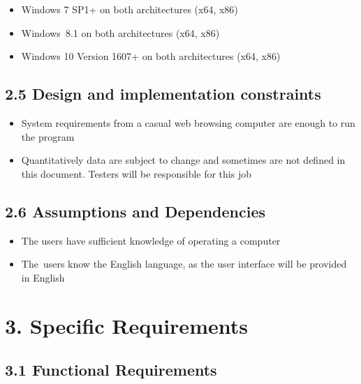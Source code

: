 \documentclass[12pt]{report}
\renewcommand{\_}{\kern-1.5pt\textunderscore\kern-1.5pt}
\begin{document}
\begin{itemize}
	\item Windows 7 SP1+ on both architectures (x64, x86)\par

	\item Windows\  8.1 on both architectures (x64, x86)\par

	\item Windows 10 Version 1607+ on both architectures (x64, x86)
\end{itemize}\par

\subsection*{2.5 Design and implementation constraints}
\begin{itemize}
	\item System requirements from a casual web browsing computer are enough to run the program\par

	\item Quantitatively data are subject to change and sometimes are not defined in this document. Testers will be responsible for this job
\end{itemize}\par

\subsection*{2.6 Assumptions and Dependencies}
\begin{itemize}
	\item The users have sufficient knowledge of operating a computer\par

	\item The\ users know the English language, as the user interface will be provided in English  
\end{itemize}\par
\newpage
\section*{3. Specific Requirements}
\subsection*{3.1 Functional Requirements}
\end{document}
